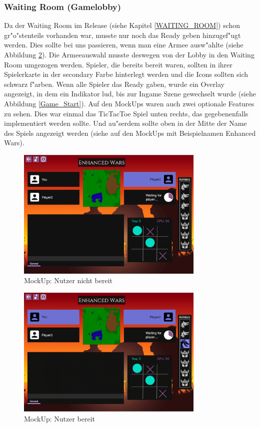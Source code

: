 \documentclass[12pt, titlepage]{scrartcl}
\newcommand{\RN}[1]{%
	\textup{\uppercase\expandafter{\romannumeral#1}}%
}
\begin{document}
		    \subsubsection{Waiting Room (Gamelobby)}
		        Da der Waiting Room im Release \RN{2} (siehe Kapitel \ref{WAITING_ROOM}) schon gr"o"stenteils vorhanden war, musste nur noch das Ready geben hinzugef"ugt werden. Dies sollte bei uns passieren, wenn man eine Armee ausw"ahlte (siehe Abbildung \ref{Ready}). Die Armeeauswahl musste deswegen von der Lobby in den Waiting Room umgezogen werden. Spieler, die bereits bereit waren, sollten in ihrer Spielerkarte in der secondary Farbe hinterlegt werden und die Icons sollten sich schwarz f"arben. Wenn alle Spieler das Ready gaben, wurde ein Overlay angezeigt, in dem ein Indikator lud, bis zur Ingame Szene gewechselt wurde (siehe Abbildung \ref{Game_Start}). Auf den MockUps waren auch zwei optionale Features zu sehen. Dies war einmal das TicTacToe Spiel unten rechts, das gegebenenfalls implementiert werden sollte. Und au"serdem sollte oben in der Mitte der Name des Spiels angezeigt werden (siehe auf den MockUps mit Beispielnamen \glqq Enhanced Wars\grqq). \\
		        \begin{figure}[H] 
    				\centering
    				\includegraphics[width=0.8\textwidth]{images/mockUps/NotReady.png}
    				\caption{MockUp: Nutzer nicht bereit}
    				\label{Not_Ready}
			    \end{figure}
			    \begin{figure}[H] 
    				\centering
    				\includegraphics[width=0.8\textwidth]{images/mockUps/Ready.png}
    				\caption{MockUp: Nutzer bereit}
    				\label{Ready}
			    \end{figure}
\end{document}
